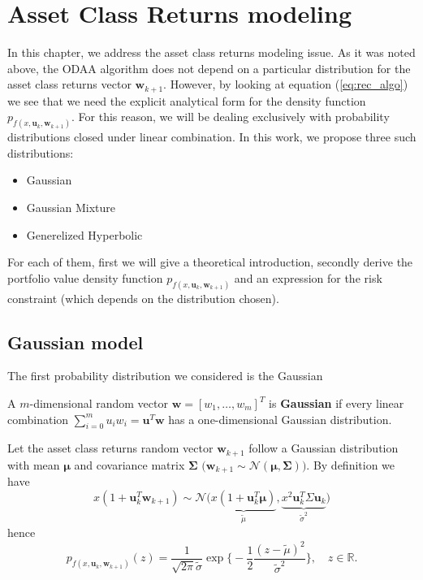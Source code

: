 \chapter{Asset Class Returns modeling}\label{chpt:assetclass_returns}
	
In this chapter, we address the asset class returns modeling issue. As it was noted above, the ODAA algorithm does not depend on a particular distribution for the asset class returns vector $\bm{w}_{k+1}$. However, by looking at equation  (\ref{eq:rec_algo}) we see that we need the explicit analytical form for the density function $p_{f(x,\bm{u}_k,\bm{w}_{k+1})}$. For this reason, we will be dealing exclusively with probability distributions closed under linear combination. In this work, we propose three such distributions:
\begin{itemize}
	\item Gaussian
	\item Gaussian Mixture
	\item Generelized Hyperbolic
\end{itemize}
For each of them, first we will give a theoretical introduction, secondly derive the portfolio value density function $p_{f(x,\bm{u}_k,\bm{w}_{k+1})}$ and an expression for the risk constraint (which depends on the distribution chosen).
\section{Gaussian model}
The first probability distribution we considered is the Gaussian 
\begin{definition}\label{def:gauss_rv}
	A $m$-dimensional random vector $\bm{w} = [w_1,\ldots,w_m]^T$ is \textbf{Gaussian} if every linear combination $\sum_{i=0}^{m}u_iw_i = \bm{u}^T \bm{w}$ has a one-dimensional Gaussian distribution.
\end{definition}
Let the asset class returns random vector $\bm{w}_{k+1}$ follow a Gaussian distribution with mean $\bm{\mu}$ and covariance matrix $\bm{\Sigma}$  $\big(\bm{w}_{k+1} \sim \mathcal{N}(\bm{\mu},\bm{\Sigma})\big)$. By definition we have \[x(1 + \bm{u}_k^T \bm{w}_{k+1}) \sim \mathcal{N}\Big(\underbrace{x(1 + \bm{u}_k^T \bm{\mu})}_{\tilde{\mu}}, \underbrace{x^2\bm{u}_k^T \Sigma \bm{u}_k}_{\tilde{\sigma}^2}\Big)\]
hence
\begin{equation}
\boxed{p_{f(x,\bm{u}_k,\bm{w}_{k+1})}(z) =  \frac{1}{\sqrt{2\pi}\tilde{\sigma}}\exp\big\{ -\frac{1}{2}\frac{(z-\tilde{\mu})^2}{\tilde{\sigma}^2}\big\}, \quad z \in \mathbb{R}.}
\end{equation}
 

